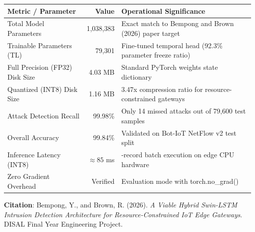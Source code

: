 \documentclass[10pt,a4paper]{article}
\begin{document}
\vspace{4pt}
\noindent
\begin{center}
\small
\begin{tabularx}{\linewidth}{@{} l r >{\RaggedRight\arraybackslash}X @{}}
\toprule
\textbf{Metric / Parameter} & \textbf{Value} & \textbf{Operational Significance} \\
\midrule
Total Model Parameters & 1,038,383 & Exact match to Bempong and Brown (2026) paper target \\
Trainable Parameters (TL) & 79,301 & Fine-tuned temporal head (92.3\% parameter freeze ratio) \\
Full Precision (FP32) Disk Size & 4.03 MB & Standard PyTorch weights state dictionary \\
Quantized (INT8) Disk Size & 1.16 MB & 3.47x compression ratio for resource-constrained gateways \\
Attack Detection Recall & 99.98\% & Only 14 missed attacks out of 79,600 test samples \\
Overall Accuracy & 99.84\% & Validated on Bot-IoT NetFlow v2 test split \\
Inference Latency (INT8) & $\approx 85$ ms & 32-record batch execution on edge CPU hardware \\
Zero Gradient Overhead & Verified & Evaluation mode with torch.no\_grad() \\
\bottomrule
\end{tabularx}
\end{center}

\vspace{8pt}
\noindent
{\footnotesize \textbf{Citation}: Bempong, Y., and Brown, R. (2026). \textit{A Viable Hybrid Swin-LSTM Intrusion Detection Architecture for Resource-Constrained IoT Edge Gateways}. DISAL Final Year Engineering Project.}
\end{document}
